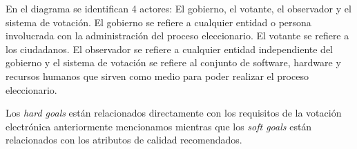 \begin{enumerate}
		En el diagrama se identifican 4 actores: El gobierno, el votante, el observador y el sistema de votación. El
		gobierno se refiere a cualquier entidad o persona involucrada con la administración del proceso eleccionario. El 
		votante se refiere a los ciudadanos. El observador se refiere a cualquier entidad independiente del gobierno y el
		sistema de votación se refiere al conjunto de software, hardware y recursos humanos que sirven como medio
		para poder realizar el proceso eleccionario. 
		
		Los \textit{hard goals} están relacionados directamente con los requisitos de la votación electrónica anteriormente
		mencionamos mientras que los \textit{soft goals} están relacionados con los atributos de calidad recomendados.
	
\end{enumerate}
